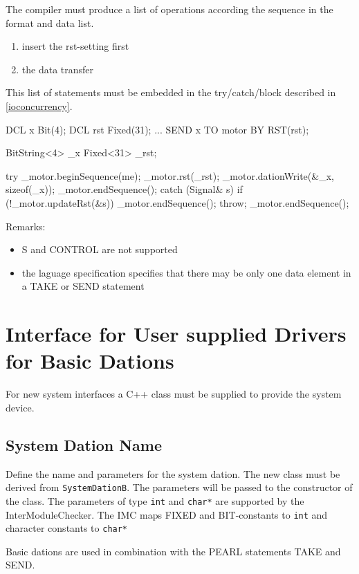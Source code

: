 The compiler must produce a list of operations according the sequence 
in the format and data list.
\begin{enumerate}
\item insert the rst-setting first
\item the data transfer 
\end{enumerate}
This list of statements must be embedded in the try/catch/block described in
\ref{ioconcurrency}.

\begin{PEARLCode}
DCL x Bit(4);
DCL rst Fixed(31);
...
SEND x TO motor BY RST(rst);
\end{PEARLCode}

\begin{CppCode}
BitString<4> _x
Fixed<31> _rst;

try {
   _motor.beginSequence(me);
   _motor.rst(_rst);
   _motor.dationWrite(&_x, sizeof(_x));
   _motor.endSequence();
} catch (Signal& s) {
   if (!_motor.updateRst(&s)) {
      _motor.endSequence();
      throw;
   }
   _motor.endSequence();
}
\end{CppCode}


Remarks:
\begin{itemize}
\item S and CONTROL are not supported
\item the laguage specification specifies that there
   may be only one data element in a TAKE or SEND statement
\end{itemize}

\section{Interface for User supplied Drivers for Basic Dations}
For new  system interfaces a C++ class must be supplied to 
provide the system device.

\subsection{System Dation Name}
Define the name and parameters for the system dation.
The new class must be derived from \verb|SystemDationB|.
The parameters will be passed to the constructor of the class.
The parameters of type \verb|int| and \verb|char*| are supported
by the InterModuleChecker. The IMC maps FIXED and BIT-constants 
to \verb|int| and character constants to \verb|char*|

Basic dations are used in combination with the PEARL statements TAKE and
SEND.

